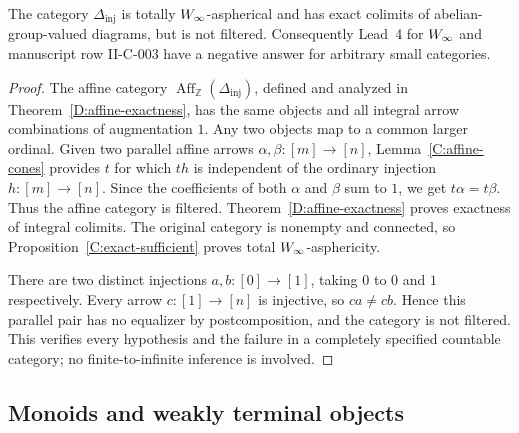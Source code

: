 \begin{theorem}\label{C:counterexample}
The category $\Delta_{\mathrm{inj}}$ is totally $W_{\infty}$-aspherical and has exact colimits of abelian-group-valued diagrams, but is not filtered. Consequently Lead~4 for $W_{\infty}$ and manuscript row II-C-003 have a negative answer for arbitrary small categories.
\end{theorem}
\begin{proof}
The affine category $\operatorname{Aff}_{\mathbb Z}(\Delta_{\mathrm{inj}})$, defined and analyzed in Theorem~\ref{D:affine-exactness}, has the same objects and all integral arrow combinations of augmentation $1$. Any two objects map to a common larger ordinal. Given two parallel affine arrows $\alpha,\beta:[m]\to[n]$, Lemma~\ref{C:affine-cones} provides $t$ for which $th$ is independent of the ordinary injection $h:[m]\to[n]$. Since the coefficients of both $\alpha$ and $\beta$ sum to $1$, we get $t\alpha=t\beta$. Thus the affine category is filtered. Theorem~\ref{D:affine-exactness} proves exactness of integral colimits. The original category is nonempty and connected, so Proposition~\ref{C:exact-sufficient} proves total $W_{\infty}$-asphericity.

There are two distinct injections $a,b:[0]\to[1]$, taking $0$ to $0$ and $1$ respectively. Every arrow $c:[1]\to[n]$ is injective, so $ca\ne cb$. Hence this parallel pair has no equalizer by postcomposition, and the category is not filtered. This verifies every hypothesis and the failure in a completely specified countable category; no finite-to-infinite inference is involved.
\end{proof}

\subsection{Monoids and weakly terminal objects}



